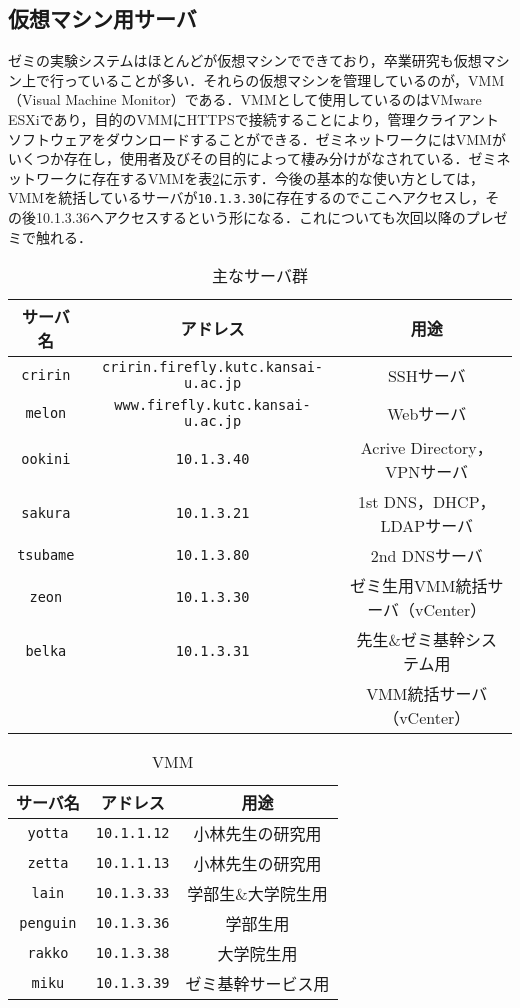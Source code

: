 \documentclass[11pt]{jarticle}
\begin{document}
\subsection{仮想マシン用サーバ}
ゼミの実験システムはほとんどが仮想マシンでできており，卒業研究も仮想マシン上で行っていることが多い．それらの仮想マシンを管理しているのが，VMM（Visual Machine Monitor）である．VMMとして使用しているのはVMware ESXiであり，目的のVMMにHTTPSで接続することにより，管理クライアントソフトウェアをダウンロードすることができる．ゼミネットワークにはVMMがいくつか存在し，使用者及びその目的によって棲み分けがなされている．ゼミネットワークに存在するVMMを表\ref{vmm}に示す．今後の基本的な使い方としては，VMMを統括しているサーバが\texttt{10.1.3.30}に存在するのでここへアクセスし，その後10.1.3.36へアクセスするという形になる．これについても次回以降のプレゼミで触れる．

\begin{table}[htbp]
\begin{center}
\caption{主なサーバ群}
\label{servers}
\begin{tabular}{|c|c|c|}
	\hline
	サーバ名 & アドレス & 用途 \\ \hline \hline
	\verb|cririn| & \verb|cririn.firefly.kutc.kansai-u.ac.jp| & SSHサーバ \\ \hline
	\verb|melon| & \verb|www.firefly.kutc.kansai-u.ac.jp| & Webサーバ \\ \hline
  \verb|ookini| & \verb|10.1.3.40| & Acrive Directory，VPNサーバ \\ \hline
	\verb|sakura| & \verb|10.1.3.21| & 1st DNS，DHCP，LDAPサーバ\\ \hline
	\verb|tsubame| & \verb|10.1.3.80| & 2nd DNSサーバ\\ \hline
	\verb|zeon| & \verb|10.1.3.30| & ゼミ生用VMM統括サーバ（vCenter） \\ \hline
	\verb|belka| & \verb|10.1.3.31| & 先生\&ゼミ基幹システム用  \\
	  &  & VMM統括サーバ（vCenter） \\ \hline
\end{tabular}
\end{center}
\end{table}

\begin{table}[htbp]
\begin{center}
\caption{VMM}
\label{vmm}
\begin{tabular}{|c|c|c|}
	\hline
	サーバ名 & アドレス & 用途 \\ \hline \hline	
	\verb|yotta| & \verb|10.1.1.12| & 小林先生の研究用\\ \hline
	\verb|zetta| & \verb|10.1.1.13| & 小林先生の研究用\\ \hline
	\verb|lain| & \verb|10.1.3.33| &  学部生\&大学院生用 \\ \hline
	\verb|penguin| & \verb|10.1.3.36| & 学部生用 \\ \hline
	\verb|rakko| & \verb|10.1.3.38| & 大学院生用 \\ \hline
	\verb|miku| & \verb|10.1.3.39| & ゼミ基幹サービス用 \\ \hline
\end{tabular}
\end{center}
\end{table}
\end{document}
